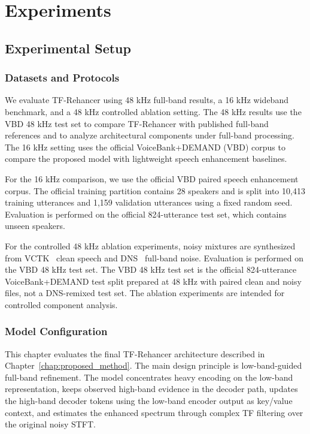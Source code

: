 \chapter{Experiments}
\label{chap:experiments}

\section{Experimental Setup}
\label{sec:exp_setup}

\subsection{Datasets and Protocols}
\label{sec:exp_datasets_protocols}

We evaluate TF-Rehancer using 48 kHz full-band results, a 16 kHz wideband benchmark, and a 48 kHz controlled ablation setting. The 48 kHz results use the VBD 48 kHz test set to compare TF-Rehancer with published full-band references and to analyze architectural components under full-band processing. The 16 kHz setting uses the official VoiceBank+DEMAND (VBD) corpus to compare the proposed model with lightweight speech enhancement baselines.

For the 16 kHz comparison, we use the official VBD paired speech enhancement corpus. The official training partition contains 28 speakers and is split into 10,413 training utterances and 1,159 validation utterances using a fixed random seed. Evaluation is performed on the official 824-utterance test set, which contains unseen speakers.

For the controlled 48 kHz ablation experiments, noisy mixtures are synthesized from VCTK~\cite{veaux2017vctk} clean speech and DNS~\cite{reddy2020dns} full-band noise. Evaluation is performed on the VBD 48 kHz test set. The VBD 48 kHz test set is the official 824-utterance VoiceBank+DEMAND test split prepared at 48 kHz with paired clean and noisy files, not a DNS-remixed test set. The ablation experiments are intended for controlled component analysis.

\subsection{Model Configuration}
\label{sec:exp_model_configuration}

This chapter evaluates the final TF-Rehancer architecture described in Chapter~\ref{chap:proposed_method}. The main design principle is low-band-guided full-band refinement. The model concentrates heavy encoding on the low-band representation, keeps observed high-band evidence in the decoder path, updates the high-band decoder tokens using the low-band encoder output as key/value context, and estimates the enhanced spectrum through complex TF filtering over the original noisy STFT.

